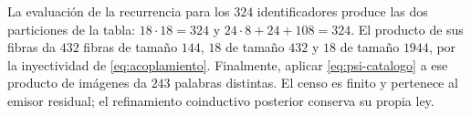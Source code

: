 La evaluación de la recurrencia para los \(324\) identificadores produce
las dos particiones de la tabla: \(18\cdot18=324\) y
\(24\cdot8+24+108=324\). El producto de sus fibras da
\(432\) fibras de tamaño \(144\), \(18\) de tamaño \(432\) y \(18\)
de tamaño \(1944\), por la inyectividad de \eqref{eq:acoplamiento}.
Finalmente, aplicar \eqref{eq:psi-catalogo} a ese producto de imágenes
da \(243\) palabras distintas. El censo es finito y pertenece al emisor
residual; el refinamiento coinductivo posterior conserva su propia ley.

